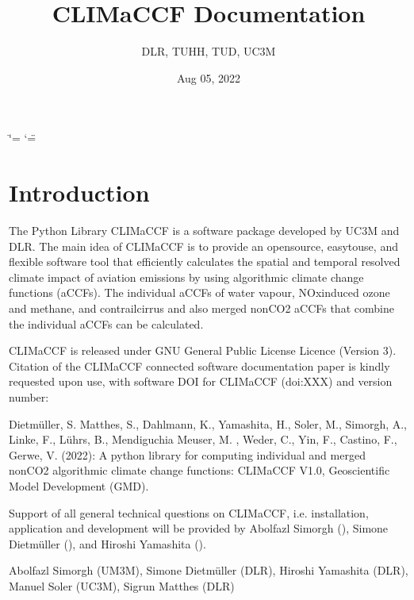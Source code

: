 \documentclass[a4paper,11pt,english]{sphinxmanual}
\title{CLIMaCCF Documentation}
\date{Aug 05, 2022}
\author{DLR, TUHH, TUD, UC3M}
\begin{document}
\ifdefined\shorthandoff
  \ifnum\catcode`\=\string=\active\shorthandoff{=}\fi
  \ifnum\catcode`\"=\active{}\fi
\fi

\pagestyle{empty}
\sphinxmaketitle
\pagestyle{plain}
\sphinxtableofcontents
\pagestyle{normal}
\label{\detokenize{index::doc}}



\chapter{Introduction}
\label{\detokenize{index:introduction}}
\sphinxAtStartPar
{} The Python Library CLIMaCCF is a software package developed by UC3M and DLR. The main idea of CLIMaCCF is to provide an open\sphinxhyphen{}source, easy\sphinxhyphen{}to\sphinxhyphen{}use, and flexible software tool that efficiently calculates the spatial and temporal resolved climate impact of aviation emissions by using algorithmic climate change functions (aCCFs). The individual aCCFs of water vapour, NOx\sphinxhyphen{}induced ozone and methane, and contrail\sphinxhyphen{}cirrus and also merged non\sphinxhyphen{}CO2 aCCFs that combine the individual aCCFs can be calculated.

\sphinxAtStartPar
{} CLIMaCCF is released under GNU General Public License Licence (Version 3). Citation of the CLIMaCCF connected software documentation paper is kindly requested upon use, with software DOI for CLIMaCCF (doi:XXX) and version number:

\sphinxAtStartPar
{} Dietmüller, S. Matthes, S., Dahlmann, K., Yamashita, H., Soler, M., Simorgh, A., Linke, F., Lührs, B., Mendiguchia Meuser, M. , Weder, C., Yin, F., Castino, F., Gerwe, V. (2022): A python library for computing individual and merged non\sphinxhyphen{}CO2 algorithmic climate change functions: CLIMaCCF V1.0, Geoscientific Model Development (GMD).

\sphinxAtStartPar
{} Support of all general technical questions on CLIMaCCF, i.e. installation, application and development will be provided by Abolfazl Simorgh (), Simone Dietmüller (), and Hiroshi Yamashita ().

\sphinxAtStartPar
{} Abolfazl Simorgh (UM3M), Simone Dietmüller (DLR), Hiroshi Yamashita (DLR), Manuel Soler (UC3M), Sigrun Matthes (DLR)
\end{document}
